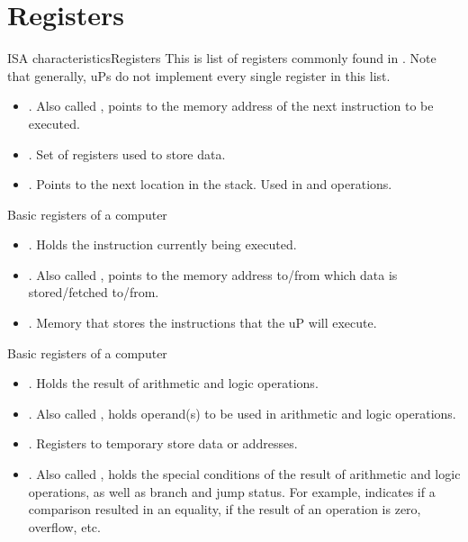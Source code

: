 \documentclass[]{slides}
\begin{document}
\section{Registers}
\begin{frame}{\acs{ISA} characteristics}{Registers}
This is list of registers commonly found in .
Note that generally, \acp{uP} do not implement every single register in this list.
  \begin{itemize}
    \item {}. Also called , points to the memory address of the next instruction to be executed.
    \item {}. Set of registers used to store data. 
    \item {}. Points to the next location in the stack. Used in  and  operations.
    \end{itemize}
\end{frame}

\begin{frame}{Basic registers of a computer}{}
  \begin{itemize}
      \item {}. Holds the instruction currently being executed.
    \item {}. Also called , points to the memory address to/from which data is stored/fetched to/from.
    \item {}. Memory that stores the instructions that the \ac{uP} will execute.
    \end{itemize}
\end{frame}

\begin{frame}{Basic registers of a computer}{}
  \begin{itemize}
    \item {}. Holds the result of arithmetic and logic operations.
    \item {}. Also called , holds operand(s) to be used in arithmetic and logic operations.
    \item {}. Registers to temporary store data or addresses.
    \item {}. Also called , holds the special conditions of the result of arithmetic and logic operations, as well as branch and jump status. For example, indicates if a comparison resulted in an equality, if the result of an operation is zero, overflow, etc.
    \end{itemize}
\end{frame}
\end{document}

